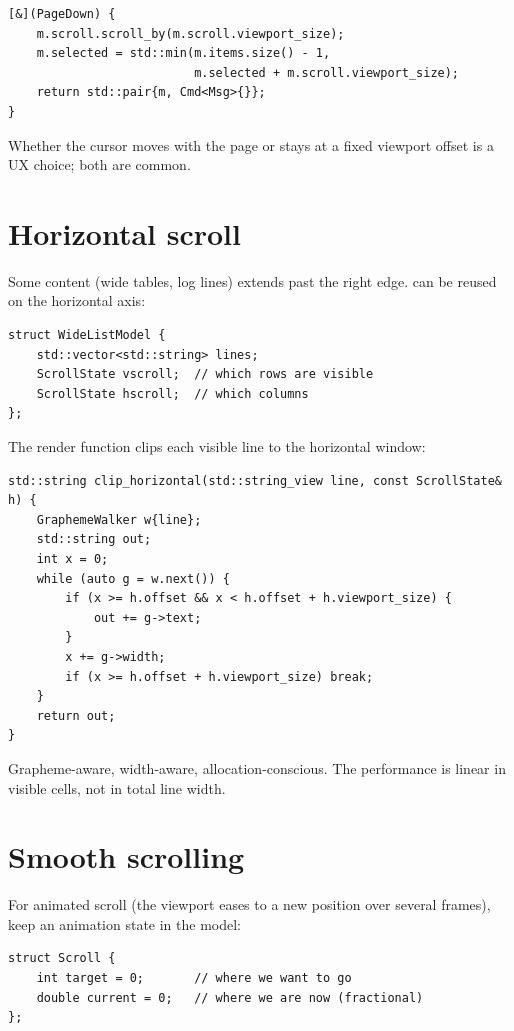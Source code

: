 \begin{lstlisting}
[&](PageDown) {
    m.scroll.scroll_by(m.scroll.viewport_size);
    m.selected = std::min(m.items.size() - 1,
                          m.selected + m.scroll.viewport_size);
    return std::pair{m, Cmd<Msg>{}};
}
\end{lstlisting}

Whether the cursor moves with the page or stays at a fixed
viewport offset is a UX choice; both are common.

\section{Horizontal scroll}

Some content (wide tables, log lines) extends past the right
edge.  can be reused on the horizontal axis:

\begin{lstlisting}
struct WideListModel {
    std::vector<std::string> lines;
    ScrollState vscroll;  // which rows are visible
    ScrollState hscroll;  // which columns
};
\end{lstlisting}

The render function clips each visible line to the horizontal
window:

\begin{lstlisting}
std::string clip_horizontal(std::string_view line, const ScrollState& h) {
    GraphemeWalker w{line};
    std::string out;
    int x = 0;
    while (auto g = w.next()) {
        if (x >= h.offset && x < h.offset + h.viewport_size) {
            out += g->text;
        }
        x += g->width;
        if (x >= h.offset + h.viewport_size) break;
    }
    return out;
}
\end{lstlisting}

Grapheme-aware, width-aware, allocation-conscious. The
performance is linear in visible cells, not in total line
width.

\section{Smooth scrolling}

For animated scroll (the viewport eases to a new position over
several frames), keep an animation state in the model:

\begin{lstlisting}
struct Scroll {
    int target = 0;       // where we want to go
    double current = 0;   // where we are now (fractional)
};
\end{lstlisting}

